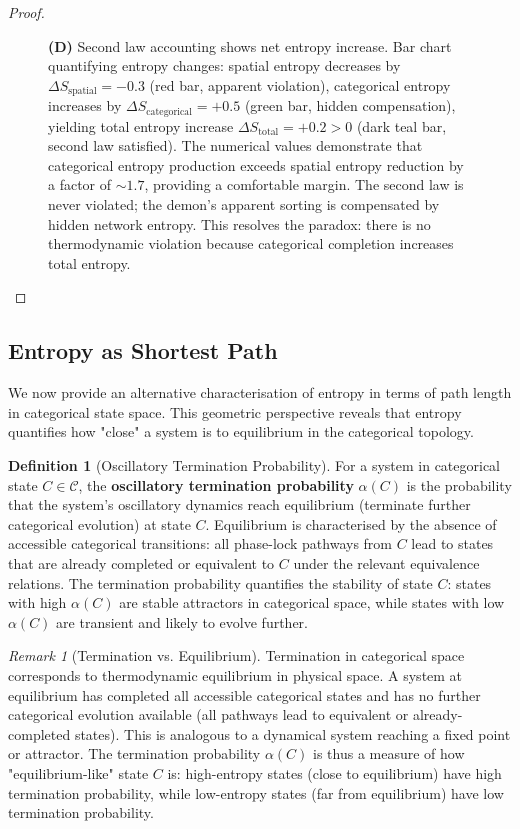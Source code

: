 \documentclass[12pt,a4paper]{article}
\theoremstyle{definition}
\newtheorem{definition}[theorem]{Definition}
\theoremstyle{remark}
\newtheorem{remark}[theorem]{Remark}
\newcommand{\catspace}{\mathcal{C}}
\begin{document}
\begin{proof}
\begin{figure}[htbp]
{\textbf{(D)} Second law accounting shows net entropy increase. Bar chart quantifying entropy changes: spatial entropy decreases by $\Delta S_{\text{spatial}} = -0.3$ (red bar, apparent violation), categorical entropy increases by $\Delta S_{\text{categorical}} = +0.5$ (green bar, hidden compensation), yielding total entropy increase $\Delta S_{\text{total}} = +0.2 > 0$ (dark teal bar, second law satisfied). The numerical values demonstrate that categorical entropy production exceeds spatial entropy reduction by a factor of $\sim 1.7$, providing a comfortable margin. The second law is never violated; the demon's apparent sorting is compensated by hidden network entropy. This resolves the paradox: there is no thermodynamic violation because categorical completion increases total entropy.}
\label{fig:dissolution_second_law}
\end{figure}
\end{proof}

\subsection{Entropy as Shortest Path}

We now provide an alternative characterisation of entropy in terms of path length in categorical state space. This geometric perspective reveals that entropy quantifies how "close" a system is to equilibrium in the categorical topology.

\begin{definition}[Oscillatory Termination Probability]
\label{def:termination_probability}
For a system in categorical state $C \in \catspace$, the \textbf{oscillatory termination probability} $\alpha(C)$ is the probability that the system's oscillatory dynamics reach equilibrium (terminate further categorical evolution) at state $C$. Equilibrium is characterised by the absence of accessible categorical transitions: all phase-lock pathways from $C$ lead to states that are already completed or equivalent to $C$ under the relevant equivalence relations. The termination probability quantifies the stability of state $C$: states with high $\alpha(C)$ are stable attractors in categorical space, while states with low $\alpha(C)$ are transient and likely to evolve further.
\end{definition}

\begin{remark}[Termination vs. Equilibrium]
\label{rem:termination_equilibrium}
Termination in categorical space corresponds to thermodynamic equilibrium in physical space. A system at equilibrium has completed all accessible categorical states and has no further categorical evolution available (all pathways lead to equivalent or already-completed states). This is analogous to a dynamical system reaching a fixed point or attractor. The termination probability $\alpha(C)$ is thus a measure of how "equilibrium-like" state $C$ is: high-entropy states (close to equilibrium) have high termination probability, while low-entropy states (far from equilibrium) have low termination probability.
\end{remark}
\end{document}
